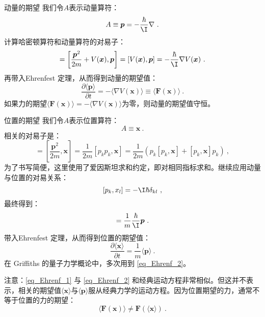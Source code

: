 \begin{example}{动量的期望}
我们令$A$表示动量算符：
\begin{equation}
A \equiv \boldsymbol{p} = -\frac{\hbar}{\I} \nabla~.
\end{equation}
计算哈密顿算符和动量算符的对易子：
\begin{equation}
[H, \boldsymbol{p}]=\left[\frac{\boldsymbol{p}^2}{2 m}+V(\boldsymbol{x}), \boldsymbol{p}\right]=[V(\boldsymbol{x}), \boldsymbol{p}]=-\frac{\hbar}{\I} \nabla V(\boldsymbol{x})~.
\end{equation}
再带入Ehrenfest 定理，从而得到动量的期望值：
\begin{equation}\label{eq_Ehrenf_1}
\frac{\partial\langle\boldsymbol{p}\rangle}{\partial t}=-\langle\nabla V(\boldsymbol{x})\rangle \equiv\langle\boldsymbol{F}(\boldsymbol{x})\rangle~.
\end{equation}
如果力的期望$\langle\boldsymbol{F}(\boldsymbol{x})\rangle=-\langle\nabla V(\boldsymbol{x})\rangle$为零，则动量的期望值守恒。
\end{example}
\begin{example}{位置的期望}
我们令$A$表示位置算符：
\begin{equation}
A \equiv \boldsymbol{x}~.
\end{equation}
相关的对易子是：
\begin{equation}
[H, \boldsymbol{x}]=\left[\frac{\boldsymbol{p}^2}{2 m}, \boldsymbol{x}\right]=\frac{1}{2 m}\left[p_k p_k, \boldsymbol{x}\right]=\frac{1}{2 m}\left(p_k\left[p_k, \boldsymbol{x}\right]+\left[p_k, \boldsymbol{x}\right] p_k\right)~,
\end{equation}
为了书写简便，这里使用了爱因斯坦求和约定，即对相同指标求和。继续应用动量与位置的对易关系：
\begin{equation}
\left[p_k, x_l\right]=-\I \hbar \delta_{k l}~,
\end{equation}
最终得到：
\begin{equation}
[H, \boldsymbol{x}]=\frac{1}{m} \frac{\hbar}{\I} \boldsymbol{p}~.
\end{equation}
带入Ehrenfest 定理，从而得到位置的期望值：
\begin{equation}\label{eq_Ehrenf_2}
\frac{\partial\langle\boldsymbol{x}\rangle}{\partial t}=\frac{1}{m}\langle\boldsymbol{p}\rangle ~.
\end{equation}
在 Griffiths 的量子力学概论\cite{GriffQ}中，多次用到 \autoref{eq_Ehrenf_2}。
\end{example}

注意：\autoref{eq_Ehrenf_1} 与 \autoref{eq_Ehrenf_2} 和经典运动方程非常相似。但这并不表示，相关的期望值$\langle\boldsymbol{x}\rangle$与$\langle\boldsymbol{p}\rangle$服从经典力学的运动方程。因为位置期望的力，通常不等于位置的力的期望：
\begin{equation}
\langle\boldsymbol{F}(\boldsymbol{x})\rangle \ne \boldsymbol{F}(\langle\boldsymbol{x}\rangle)~.
\end{equation}